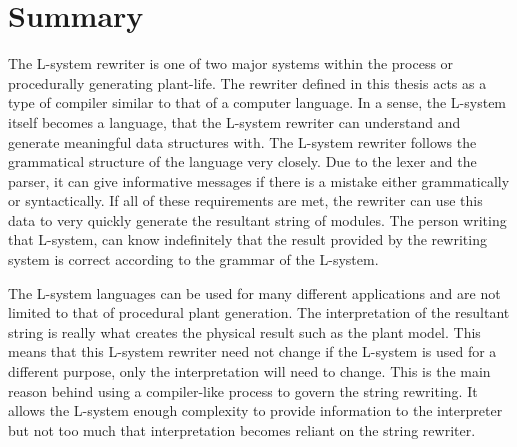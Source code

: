 \newpage
\section{Summary}

The L-system rewriter is one of two major systems within the process or procedurally generating plant-life. The rewriter defined in this thesis acts as a type of compiler similar to that of a computer language. In a sense, the L-system itself becomes a language, that the L-system rewriter can understand and generate meaningful data structures with. The L-system rewriter follows the grammatical structure of the language very closely. Due to the lexer and the parser, it can give informative messages if there is a mistake either grammatically or syntactically. If all of these requirements are met, the rewriter can use this data to very quickly generate the resultant string of modules. The person writing that L-system, can know indefinitely that the result provided by the rewriting system is correct according to the grammar of the L-system.

The L-system languages can be used for many different applications and are not limited to that of procedural plant generation. The interpretation of the resultant string is really what creates the physical result such as the plant model. This means that this L-system rewriter need not change if the L-system is used for a different purpose, only the interpretation will need to change. This is the main reason behind using a compiler-like process to govern the string rewriting. It allows the L-system enough complexity to provide information to the interpreter but not too much that interpretation becomes reliant on the string rewriter.